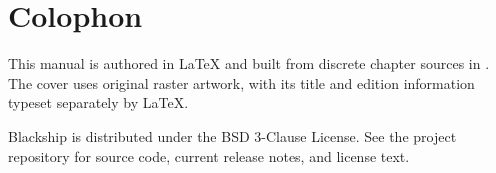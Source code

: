 \documentclass[11pt,openany]{book}
\begin{document}
\frontmatter


\begingroup
\setlength{\parskip}{0.5em}
\hypersetup{linkcolor=black}
\tableofcontents
\endgroup

\let\standardcleardoublepage\cleardoublepage
\let\cleardoublepage\clearpage
\mainmatter
\let\cleardoublepage\standardcleardoublepage













\appendix



\backmatter
\chapter*{Colophon}
This manual is authored in LaTeX and built from discrete chapter sources in
. The cover uses original raster artwork, with its
title and edition information typeset separately by LaTeX.

Blackship is distributed under the BSD 3-Clause License. See the project
repository for source code, current release notes, and license text.
\end{document}
